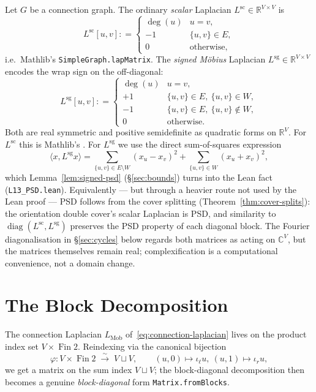 \documentclass[11pt,a4paper]{amsart}
\theoremstyle{plain}
\theoremstyle{definition}
\theoremstyle{remark}
\newcommand{\RR}{\mathbb{R}}
\newcommand{\CC}{\mathbb{C}}
\newcommand{\Lscalar}{L^{\operatorname{sc}}}
\newcommand{\Lsigned}{L^{\operatorname{sg}}}
\newcommand{\pair}[2]{\langle #1, #2 \rangle}
\newcommand{\defeq}{\mathrel{\mathop:}=}
\begin{document}
Let $G$ be a connection graph. The ordinary \emph{scalar}
Laplacian $\Lscalar \in \RR^{V\times V}$ is
\[
  \Lscalar[u,v] \defeq
    \begin{cases} \deg(u) & u=v,\\
      -1 & \{u,v\}\in E,\\ 0 & \text{otherwise,}\end{cases}
\]
i.e.\ Mathlib's
\texttt{SimpleGraph.lapMatrix}.
The \emph{signed Möbius} Laplacian $\Lsigned \in \RR^{V\times V}$
encodes the wrap sign on the off-diagonal:
\[
  \Lsigned[u,v] \defeq
    \begin{cases} \deg(u) & u=v,\\
      +1 & \{u,v\}\in E,\ \{u,v\}\in W,\\
      -1 & \{u,v\}\in E,\ \{u,v\}\notin W,\\
      0 & \text{otherwise.}\end{cases}
\]
Both are real symmetric and positive semidefinite as quadratic forms
on $\RR^V$. For $\Lscalar$ this is Mathlib's
. For $\Lsigned$ we use the
direct sum-of-squares expression
\[
  \pair{x}{\Lsigned x}
  = \!\!\sum_{\{u,v\}\in E\setminus W}\! (x_u - x_v)^2
  + \sum_{\{u,v\}\in W} (x_u + x_v)^2,
\]
which Lemma~\ref{lem:signed-psd} (\S\ref{sec:bounds}) turns into the
Lean fact 
(\texttt{L13\_PSD.lean}). Equivalently --- but through a heavier route
not used by the Lean proof --- PSD follows from the cover splitting
(Theorem~\ref{thm:cover-splits}): the orientation double cover's
scalar Laplacian is PSD, and similarity to
$\operatorname{diag}(\Lscalar,\Lsigned)$ preserves the PSD property of
each diagonal block.
The Fourier diagonalisation in \S\ref{sec:cycles} below regards both
matrices as acting on $\CC^V$, but the matrices themselves remain
real; complexification is a computational convenience, not a domain
change.

\section{The Block Decomposition}\label{sec:decomp}

The connection Laplacian
$L_{\operatorname{Mob}}$ of~\eqref{eq:connection-laplacian}
lives on the product index set $V\times \operatorname{Fin}2$.
Reindexing via the canonical bijection
\[
  \varphi : V\times \operatorname{Fin}2 \;\xrightarrow{\;\sim\;}\; V\sqcup V,
  \qquad (u,0)\mapsto \iota_\ell u,\ (u,1)\mapsto \iota_r u,
\]
we get a matrix on the sum index $V\sqcup V$; the block-diagonal
decomposition then becomes a genuine \emph{block-diagonal} form
\texttt{Matrix.fromBlocks}.
\end{document}
